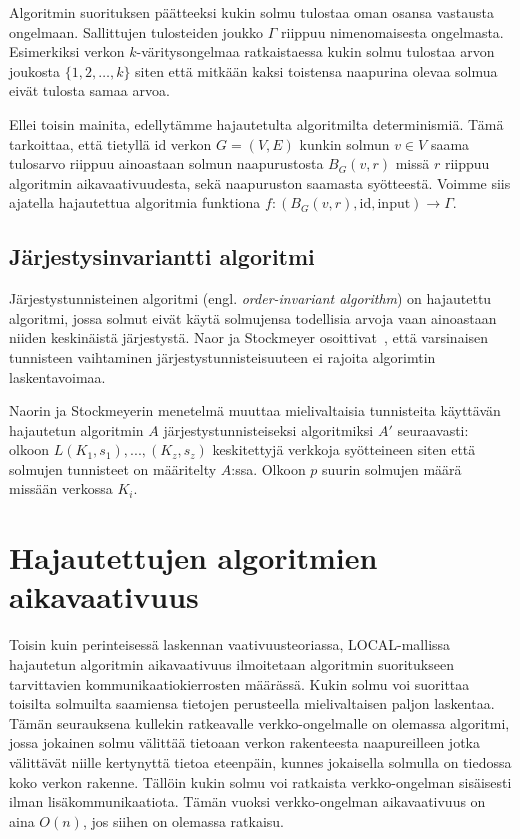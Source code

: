 \documentclass[12pt,finnish]{tktltiki2}
\theoremstyle{definition}
\theoremstyle{remark}
\begin{document}
Algoritmin suorituksen päätteeksi kukin solmu tulostaa oman osansa vastausta ongelmaan. Sallittujen tulosteiden joukko $\Gamma$ riippuu nimenomaisesta ongelmasta. Esimerkiksi verkon $k$-väritysongelmaa ratkaistaessa kukin solmu tulostaa arvon joukosta $\{1, 2, \ldots, k\}$ siten että mitkään kaksi toistensa naapurina olevaa solmua eivät tulosta samaa arvoa.

Ellei toisin mainita, edellytämme hajautetulta algoritmilta determinismiä. Tämä tarkoittaa, että tietyllä $\text{id}$ verkon $G = (V, E)$ kunkin solmun $v \in V$ saama tulosarvo riippuu ainoastaan solmun naapurustosta $B_G(v, r)$ missä $r$ riippuu algoritmin aikavaativuudesta, sekä naapuruston saamasta syötteestä. Voimme siis ajatella hajautettua algoritmia funktiona $f: (B_G(v, r), \text{id}, \text{input}) \rightarrow \Gamma$.


\subsection{Järjestysinvariantti algoritmi}
Järjestystunnisteinen algoritmi (engl. \textit{order-invariant algorithm}) on hajautettu algoritmi, jossa solmut eivät käytä solmujensa todellisia arvoja vaan ainoastaan niiden keskinäistä järjestystä. Naor ja Stockmeyer osoittivat~\cite{naor95}, että varsinaisen tunnisteen vaihtaminen järjestystunnisteisuuteen ei rajoita algorimtin laskentavoimaa.


Naorin ja Stockmeyerin menetelmä muuttaa mielivaltaisia tunnisteita käyttävän hajautetun algoritmin $A$ järjestystunnisteiseksi algoritmiksi $A'$ seuraavasti: olkoon $L(K_1, s_1), ... , (K_z,s_z)$ keskitettyjä verkkoja syötteineen siten että solmujen tunnisteet on määritelty $A$:ssa. Olkoon $p$ suurin solmujen määrä missään verkossa $K_i$.

\section{Hajautettujen algoritmien aikavaativuus}
Toisin kuin perinteisessä laskennan vaativuusteoriassa, LOCAL-mallissa hajautetun algoritmin aikavaativuus ilmoitetaan algoritmin suoritukseen tarvittavien kommunikaatiokierrosten määrässä. Kukin solmu voi suorittaa toisilta solmuilta saamiensa tietojen perusteella mielivaltaisen paljon laskentaa. Tämän seurauksena kullekin ratkeavalle verkko-ongelmalle on olemassa algoritmi, jossa jokainen solmu välittää tietoaan verkon rakenteesta naapureilleen jotka välittävät niille kertynyttä tietoa eteenpäin, kunnes jokaisella solmulla on tiedossa koko verkon rakenne. Tällöin kukin solmu voi ratkaista verkko-ongelman sisäisesti ilman lisäkommunikaatiota. Tämän vuoksi verkko-ongelman aikavaativuus on aina $O(n)$, jos siihen on olemassa ratkaisu.
\end{document}
